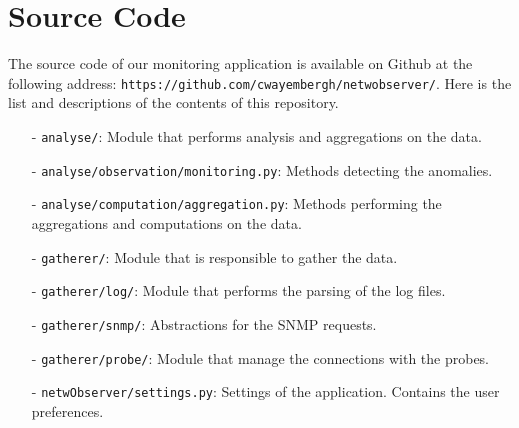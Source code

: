 

\chapter{Source Code} %
\label{AppendixA} %

The source code of our monitoring application is available on Github at the following address: \texttt{https://github.com/cwayembergh/netwobserver/}.
Here is the list and descriptions of the contents of this repository.

\begin{itemize}
\item[-] \texttt{analyse/}: Module that performs analysis and aggregations on the data.
\item[-] \texttt{analyse/observation/monitoring.py}: Methods detecting the anomalies.
\item[-] \texttt{analyse/computation/aggregation.py}: Methods performing the aggregations and computations on the data.
\item[-] \texttt{gatherer/}: Module that is responsible to gather the data.
\item[-] \texttt{gatherer/log/}: Module that performs the parsing of the log files.
\item[-] \texttt{gatherer/snmp/}: Abstractions for the SNMP requests.
\item[-] \texttt{gatherer/probe/}: Module that manage the connections with the probes.
\item[-] \texttt{netwObserver/settings.py}: Settings of the application. Contains the user preferences.
\end{itemize}


